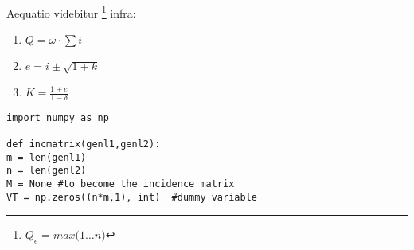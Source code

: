 %
%

\lipsum[11]


	\lipsum[2]
	
	
	\newp Aequatio videbitur \footnote{ $Q_e = max\big(1 \dots n\big)$} infra:
	
	

	\lipsum[4]

	\begin{enumerate}
		\item {$Q = \omega \cdot \sum i$}
		\item {$e = i \pm \sqrt{1+k}$}
		\item {$K = \frac{1 + e}{1 - \delta}$}
	\end{enumerate}


	\lipsum[15] \newp

\lstset{style=Python}
\begin{lstlisting}
import numpy as np

def incmatrix(genl1,genl2):
m = len(genl1)
n = len(genl2)
M = None #to become the incidence matrix
VT = np.zeros((n*m,1), int)  #dummy variable
\end{lstlisting}